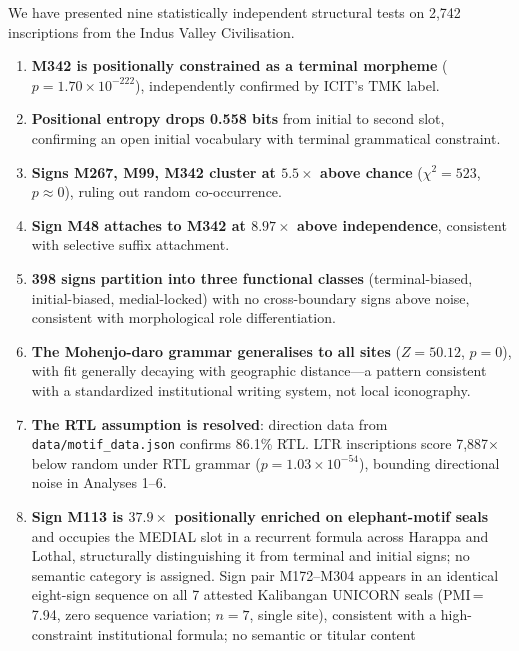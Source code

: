 \documentclass[12pt,letterpaper]{article}
\begin{document}
We have presented nine statistically independent structural tests on
2,742 inscriptions from the Indus Valley Civilisation.

\begin{enumerate}
    \item \textbf{M342 is positionally constrained as a terminal morpheme}
          ($p = 1.70 \times 10^{-222}$), independently confirmed by ICIT's
          TMK label.
    \item \textbf{Positional entropy drops 0.558 bits} from initial to
          second slot, confirming an open initial vocabulary with
          terminal grammatical constraint.
    \item \textbf{Signs M267, M99, M342 cluster at $5.5\times$ above
          chance} ($\chi^2 = 523$, $p \approx 0$), ruling out random
          co-occurrence.
    \item \textbf{Sign M48 attaches to M342 at $8.97\times$ above
          independence}, consistent with selective suffix attachment.
    \item \textbf{398 signs partition into three functional classes}
          (terminal-biased, initial-biased, medial-locked) with no
          cross-boundary signs above noise, consistent with morphological
          role differentiation.
    \item \textbf{The Mohenjo-daro grammar generalises to all sites}
          ($Z = 50.12$, $p = 0$), with fit generally decaying
          with geographic distance---a pattern consistent with a
          standardized institutional writing system, not local iconography.
    \item \textbf{The RTL assumption is resolved}: direction data
          from \texttt{data/motif\_data.json} confirms 86.1\% RTL. LTR
          inscriptions score 7,887$\times$ below random under RTL
          grammar ($p = 1.03 \times 10^{-54}$), bounding directional
          noise in Analyses 1--6.
    \item \textbf{Sign M113 is $37.9\times$ positionally enriched on
          elephant-motif seals} and occupies the MEDIAL slot in a
          recurrent formula across Harappa and Lothal, structurally
          distinguishing it from terminal and initial signs; no
          semantic category is assigned.
          Sign pair M172--M304 appears in an identical eight-sign
          sequence on all 7 attested Kalibangan UNICORN seals
          (PMI\,=\,7.94, zero sequence variation; $n = 7$,
          single site), consistent with a high-constraint
          institutional formula; no semantic or titular content

\end{enumerate}
\end{document}
